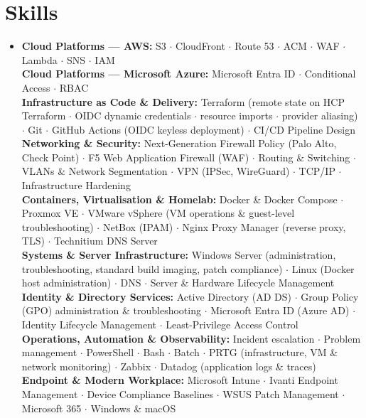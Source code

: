 \documentclass[a4paper,10pt]{article}
\newcommand{\resumeSubHeadingListStart}{\begin{itemize}[leftmargin=0.15in, label={}]}
\newcommand{\resumeSubHeadingListEnd}{\end{itemize}}
\begin{document}
\section{Skills}
  \resumeSubHeadingListStart
    \item\small{
      \textbf{Cloud Platforms --- AWS:} S3 $\cdot$ CloudFront $\cdot$ Route 53 $\cdot$ ACM $\cdot$ WAF $\cdot$ Lambda $\cdot$ SNS $\cdot$ IAM \\
      \textbf{Cloud Platforms --- Microsoft Azure:} Microsoft Entra ID $\cdot$ Conditional Access $\cdot$ RBAC \\
      \textbf{Infrastructure as Code \& Delivery:} Terraform (remote state on HCP Terraform $\cdot$ OIDC dynamic credentials $\cdot$ resource imports $\cdot$ provider aliasing) $\cdot$ Git $\cdot$ GitHub Actions (OIDC keyless deployment) $\cdot$ CI/CD Pipeline Design \\
      \textbf{Networking \& Security:} Next-Generation Firewall Policy (Palo Alto, Check Point) $\cdot$ F5 Web Application Firewall (WAF) $\cdot$ Routing \& Switching $\cdot$ VLANs \& Network Segmentation $\cdot$ VPN (IPSec, WireGuard) $\cdot$ TCP/IP $\cdot$ Infrastructure Hardening \\
      \textbf{Containers, Virtualisation \& Homelab:} Docker \& Docker Compose $\cdot$ Proxmox VE $\cdot$ VMware vSphere (VM operations \& guest-level troubleshooting) $\cdot$ NetBox (IPAM) $\cdot$ Nginx Proxy Manager (reverse proxy, TLS) $\cdot$ Technitium DNS Server \\
      \textbf{Systems \& Server Infrastructure:} Windows Server (administration, troubleshooting, standard build imaging, patch compliance) $\cdot$ Linux (Docker host administration) $\cdot$ DNS $\cdot$ Server \& Hardware Lifecycle Management \\
      \textbf{Identity \& Directory Services:} Active Directory (AD DS) $\cdot$ Group Policy (GPO) administration \& troubleshooting $\cdot$ Microsoft Entra ID (Azure AD) $\cdot$ Identity Lifecycle Management $\cdot$ Least-Privilege Access Control \\
      \textbf{Operations, Automation \& Observability:} Incident escalation $\cdot$ Problem management $\cdot$ PowerShell $\cdot$ Bash $\cdot$ Batch $\cdot$ PRTG (infrastructure, VM \& network monitoring) $\cdot$ Zabbix $\cdot$ Datadog (application logs \& traces) \\
      \textbf{Endpoint \& Modern Workplace:} Microsoft Intune $\cdot$ Ivanti Endpoint Management $\cdot$ Device Compliance Baselines $\cdot$ WSUS Patch Management $\cdot$ Microsoft 365 $\cdot$ Windows \& macOS
      \vspace{-6pt}
    }
  \resumeSubHeadingListEnd
\end{document}
